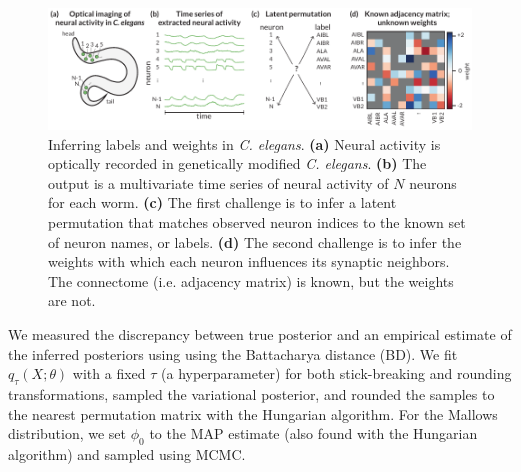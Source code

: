 \documentclass[twoside]{article}
\begin{document}
\begin{figure}[ht]
  \centering
  \includegraphics[width=6.25in]{celegans.pdf} 
  \caption{Inferring labels and weights in \textit{C. elegans}.
    \textbf{(a)} Neural activity is optically recorded in genetically
    modified \textit{C. elegans}. 
    \textbf{(b)} The output is a multivariate time series of
    neural activity of $N$ neurons for each worm.
    \textbf{(c)} The first challenge is to infer a latent permutation
    that matches observed neuron indices to the known set of neuron
    names, or labels.
    \textbf{(d)} The second challenge is to infer the weights with
    which each neuron influences its synaptic neighbors.  The connectome
    (i.e. adjacency matrix) is known, but the weights are not. }
  \vspace{-1em}
  \label{fig:celegans}
\end{figure}

We measured the discrepancy between true posterior and an empirical
estimate of the inferred posteriors using using the Battacharya
distance (BD). We fit $q_\tau(X; \theta)$ with a fixed $\tau$
(a hyperparameter)
for both stick-breaking and rounding transformations, sampled the
variational posterior, and rounded the samples to the nearest
permutation matrix with the Hungarian algorithm. For the Mallows
distribution, we set $\phi_0$ to the MAP estimate (also found with the
Hungarian algorithm) and sampled using MCMC.
 
\end{document}
